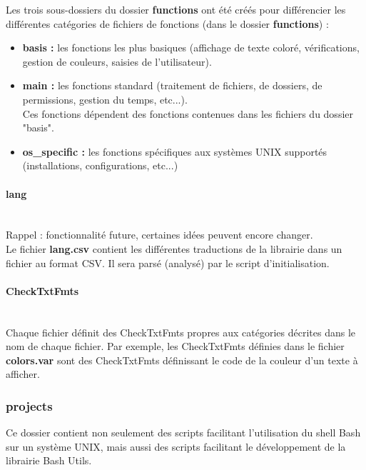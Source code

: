\documentclass[a4paper,10pt]{article}
\begin{document}
Les trois sous-dossiers du dossier \textbf{functions} ont été créés pour différencier les différentes catégories de fichiers de fonctions (dans le dossier \textbf{functions}) :
\begin{itemize}
    \item \color{lime}\textbf{basis\color{white} :} \color{white} les fonctions les plus basiques (affichage de texte coloré, vérifications, gestion de couleurs, saisies de l'utilisateur).
    
    \item \color{lime}\textbf{main\color{white} :} \color{white} les fonctions standard (traitement de fichiers, de dossiers, de permissions, gestion du temps, etc...).\\[1\baselineskip]

    Ces fonctions dépendent des fonctions contenues dans les fichiers du dossier "basis".\\[1\baselineskip]

    \item \color{lime}\textbf{os\_specific\color{white} :} \color{white} les fonctions spécifiques aux systèmes UNIX supportés (installations, configurations, etc...)
\end{itemize}

\paragraph{lang}\mbox{}\\
Rappel : fonctionnalité future, certaines idées peuvent encore changer.\\[1\baselineskip]

Le fichier \color{lime}\textbf{lang.csv} \color{white} contient les différentes traductions de la librairie dans un fichier au format CSV. Il sera parsé (analysé) par le script d'initialisation.

\paragraph{CheckTxtFmts}\mbox{}\\
Chaque fichier définit des CheckTxtFmts propres aux catégories décrites dans le nom de chaque fichier. Par exemple, les CheckTxtFmts définies dans le fichier \color{lime}\textbf{colors.var}\color{white} sont des CheckTxtFmts définissant le code de la couleur d'un texte à afficher.

\color{blue}
\subsubsection{projects}\color{white}
Ce dossier contient non seulement des scripts facilitant l'utilisation du shell Bash sur un système UNIX, mais aussi des scripts facilitant le développement de la librairie Bash Utils.
\end{document}
